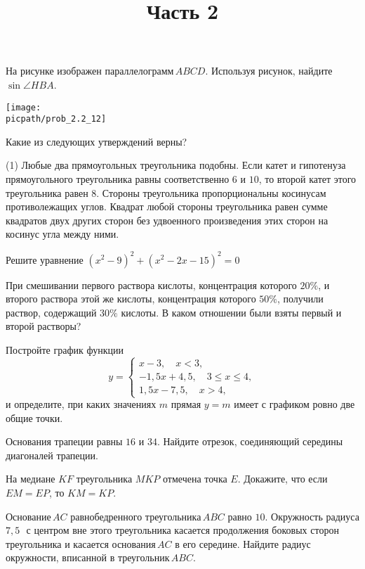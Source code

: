 \begin{training}[2]
\begin{listofex}
		\foranswer
		\item \begin{minipage}[t]{\bodywidth}
			На рисунке изображен параллелограмм \( ABCD \). Используя рисунок, найдите \( \sin\angle HBA \).
			\foranswer
		\end{minipage}
		\gapwidth
		\begin{minipage}[t]{\picwidth}
			\texttt{[image: \\picpath/prob\_2.2\_12]}
		\end{minipage}
		\item Какие из следующих утверждений верны?
		\begin{tasks}(1)
			\task Любые два прямоугольных треугольника подобны.
			\task Если катет и гипотенуза прямоугольного треугольника равны соответственно \( 6 \) и \( 10 \), то второй катет этого треугольника равен \( 8 \).
			\task Стороны треугольника пропорциональны косинусам противолежащих углов.
			\task Квадрат любой стороны треугольника равен сумме квадратов двух других сторон без удвоенного произведения этих сторон на косинус угла между ними.
		\end{tasks}
		\foranswer
		\title{Часть 2}
		\item Решите уравнение \( (x^2-9)^2+(x^2-2x-15)^2=0 \)
		\item При смешивании первого раствора кислоты, концентрация которого \( 20\% \), и второго раствора этой же кислоты, концентрация которого \( 50\% \), получили раствор, содержащий \( 30\% \) кислоты. В каком отношении были взяты первый и второй растворы?
		\item Постройте график функции
		\[y= \left\{
		\begin{array}{l}
			x-3, \quad x<3,\\
			-1,5x+4,5,\quad 3\le x\le4,\\
			1,5x-7,5, \quad x>4,
		\end{array}
		\right.\]
		и определите, при каких значениях \( m \) прямая \( y=m \) имеет с графиком ровно две общие точки.
		\item Основания трапеции равны \( 16 \) и \( 34 \). Найдите отрезок, соединяющий середины диагоналей трапеции.
		\item На медиане \( KF \) треугольника \( MKP \) отмечена точка \( E \). Докажите, что если \( EM=EP \), то \( KM=KP \).
		\item Основание \( AC \) равнобедренного треугольника \( ABC \) равно \( 10 \). Окружность радиуса \( 7,5 \) \( \, \) с центром вне этого треугольника касается продолжения боковых сторон треугольника и касается основания \( AC \) в его середине. Найдите радиус окружности, вписанной в треугольник \( ABC \).
	\end{listofex}
\end{training}
